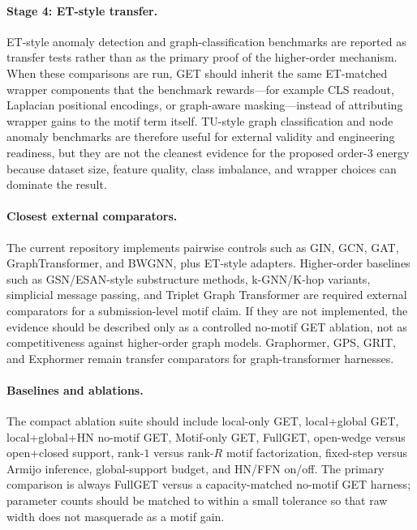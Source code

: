 \documentclass[11pt,a4paper]{article}
\begin{document}
\paragraph{Stage 4: ET-style transfer.}
ET-style anomaly detection and graph-classification benchmarks are reported as
transfer tests rather than as the primary proof of the higher-order mechanism.
When these comparisons are run, GET should inherit the same ET-matched wrapper
components that the benchmark rewards---for example CLS readout, Laplacian
positional encodings, or graph-aware masking---instead of attributing wrapper
gains to the motif term itself. TU-style graph classification and node anomaly
benchmarks are therefore useful for external validity and engineering
readiness, but they are not the cleanest evidence for the proposed order-3
energy because dataset size, feature quality, class imbalance, and wrapper
choices can dominate the result.

\paragraph{Closest external comparators.}
The current repository implements pairwise controls such as GIN, GCN, GAT,
GraphTransformer, and BWGNN, plus ET-style adapters. Higher-order baselines
such as GSN/ESAN-style substructure methods, k-GNN/K-hop variants, simplicial
message passing, and Triplet Graph Transformer are required external
comparators for a submission-level motif claim. If they are not implemented, the
evidence should be described only as a controlled no-motif GET ablation, not as
competitiveness against higher-order graph models. Graphormer, GPS, GRIT, and
Exphormer remain transfer comparators for graph-transformer harnesses.

\paragraph{Baselines and ablations.}
The compact ablation suite should include local-only GET, local+global GET,
local+global+HN no-motif GET, Motif-only GET, FullGET, open-wedge versus
open+closed support, rank-$1$ versus rank-$R$ motif factorization, fixed-step
versus Armijo inference, global-support budget, and HN/FFN on/off. The primary
comparison is always FullGET versus a capacity-matched no-motif GET harness;
parameter counts should be matched to within a small tolerance so that raw
width does not masquerade as a motif gain.
\end{document}
